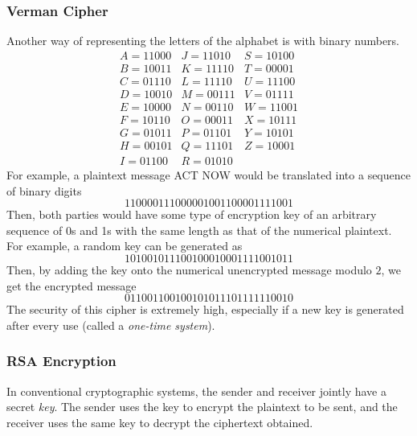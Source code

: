 \documentclass{article}
\newcounter{example}[section]
\begin{document}
\subsubsection{Verman Cipher}
Another way of representing the letters of the alphabet is with binary numbers. 
\begin{equation}
  \begin{array}{ccc}
      A = 11000 & J = 11010 & S = 10100 \\
      B = 10011 & K = 11110 & T = 00001 \\
      C = 01110 & L = 11110 & U = 11100 \\
      D = 10010 & M = 00111 & V = 01111 \\
      E = 10000 & N = 00110 & W = 11001 \\
      F = 10110 & O = 00011 & X = 10111 \\
      G = 01011 & P = 01101 & Y = 10101 \\
      H = 00101 & Q = 11101 & Z = 10001 \\
      I = 01100 & R = 01010
  \end{array}
\end{equation}
For example, a plaintext message ACT NOW would be translated into a sequence of binary digits
\begin{equation}
  110000111000001001100001111001
\end{equation}
Then, both parties would have some type of encryption key of an arbitrary sequence of 0s and 1s with the same length as that of the numerical plaintext. For example, a random key can be generated as
\begin{equation}
  101001011100100010001111001011
\end{equation}
Then, by adding the key onto the numerical unencrypted message modulo $2$, we get the encrypted message
\begin{equation}
  011001100100101011101111110010
\end{equation}
The security of this cipher is extremely high, especially if a new key is generated after every use (called a \textit{one-time system}). 

\subsubsection{RSA Encryption}
In conventional cryptographic systems, the sender and receiver jointly have a secret \textit{key}. The sender uses the key to encrypt the plaintext to be sent, and the receiver uses the same key to decrypt the ciphertext obtained. 
\end{document}
